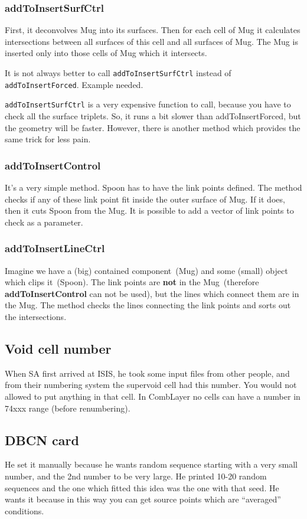 \subsubsection{addToInsertSurfCtrl}
First, it deconvolves Mug into its surfaces.
Then for each cell of Mug it calculates intersections between all surfaces of this cell and all surfaces of Mug.
The Mug is inserted only into those cells of Mug which it intersects.

It is not always better to call {\tt addToInsertSurfCtrl} instead of {\tt addToInsertForced}. \alert{Example needed.}

{\tt addToInsertSurfCtrl} is a very expensive function to call, because you have to check all the surface triplets. So, it runs a bit slower than addToInsertForced, but the geometry will be faster.
However, there is another method which provides the same trick for less pain.

\subsubsection{addToInsertControl}
It's a very simple method. Spoon has to have the link points defined.
The method checks if any of these link point fit inside the outer surface of Mug. If it does, then it cuts Spoon from the Mug.
It is possible to add a vector of link points to check as a parameter.

\subsubsection{addToInsertLineCtrl}
Imagine we have a (big) contained component~(Mug) and some (small) object which clips it~(Spoon). The link points are {\bf not} in the Mug~(therefore {\bf addToInsertControl} can not be used), but the lines which connect them are in the Mug.
The method checks the lines connecting the link points and sorts out the intersections.

\subsection{Void cell number}
When SA first arrived at ISIS, he took some input files from other people, and from their numbering system the supervoid cell had this number.
You would not allowed to put anything in that cell. In CombLayer no cells can have a number in 74xxx range (before renumbering).

\subsection{DBCN card}
He set it manually because he wants random sequence starting with a very small number, and the 2nd number to be very large.
He printed 10-20 random sequences and the one which fitted this idea was the one with that seed.
He wants it because in this way you can get source points which are ``averaged'' conditions.
